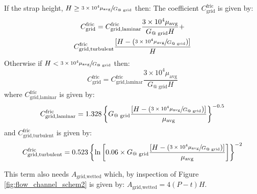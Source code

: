 If the strap height, $H \ge \sfrac{3 \times 10^4 \mu_{\text{avg}}}{G_{\text{@ grid}}}$ then:  
The coefficient $C_{\text{grid}}^{\text{fric}}$ is given by:
\begin{multline*}
C_{\text{grid}}^{\text{fric}}=C_{\text{grid,laminar}}^{\text{fric}} \frac{3 \times 10^4 \mu_{\text{avg}}}{G_{\text{@ grid}} H} + \\ C_{\text{grid,turbulent}}^{\text{fric}} \frac{[H - (\sfrac{3 \times 10^4 \mu_{\text{avg}}}{G_{\text{@ grid}}})]}{H}  
\end{multline*} 
Otherwise if $H < \sfrac{3 \times 10^4 \mu_{\text{avg}}}{G_{\text{@ grid}}}$ then: 
\begin{equation*}
C_{\text{grid}}^{\text{fric}}=C_{\text{grid,laminar}}^{\text{fric}} \frac{3 \times 10^4 \mu_{\text{avg}}}{G_{\text{@ grid}} H}
\end{equation*}
where $C_{\text{grid,laminar}}^{\text{fric}}$ is given by:
$$C_{\text{grid,laminar}}^{\text{fric}}=1.328 \left\{G_{\text{@ grid}} \frac{\left[H - \left(\sfrac{3 \times 10^4 \mu_{\text{avg}}}{G_{\text{@ grid}}}  \right)  \right]}{\mu_{\text{avg}}} \right\}^{-0.5}  $$
and $C_{\text{grid,turbulent}}^{\text{fric}}$ is given by:
$$C_{\text{grid,turbulent}}^{\text{fric}} = 0.523\left\{ \ln{\left[ 0.06 \times G_{\text{@ grid}} \frac{\left[H - \left(\sfrac{3 \times 10^4 \mu_{\text{avg}}}{G_{\text{@ grid}}}  \right)  \right]}{\mu_{\text{avg}}} \right]} \right\}^{-2}  $$

This term also needs $A_{\text{grid,wetted}}$ which, by inspection of Figure \ref{fig:flow_channel_schem2} is given by: $A_{\text{grid,wetted}} = 4(P-t)H.$
